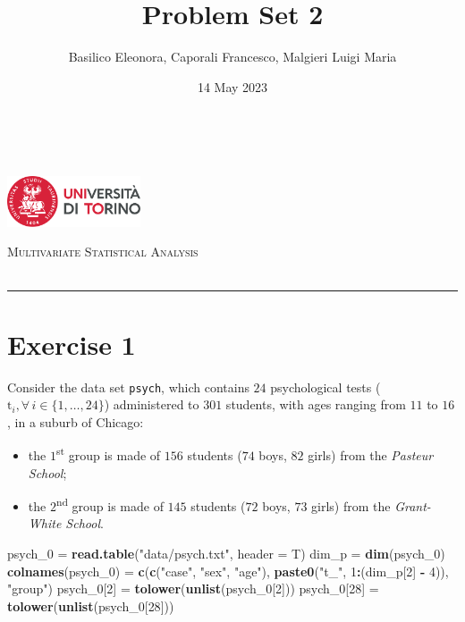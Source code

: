 \documentclass[
]{article}
\title{Problem Set 2}
\author{Basilico Eleonora, Caporali Francesco, Malgieri Luigi Maria}
\date{14 May 2023}
\makeatletter
\newenvironment{Shaded}{\begin{snugshade}}{\end{snugshade}}
\newcommand{\AttributeTok}[1]{\textcolor[rgb]{0.13,0.29,0.53}{#1}}
\newcommand{\DecValTok}[1]{\textcolor[rgb]{0.00,0.00,0.81}{#1}}
\newcommand{\FunctionTok}[1]{\textcolor[rgb]{0.13,0.29,0.53}{\textbf{#1}}}
\newcommand{\NormalTok}[1]{#1}
\newcommand{\OtherTok}[1]{\textcolor[rgb]{0.56,0.35,0.01}{#1}}
\newcommand{\SpecialCharTok}[1]{\textcolor[rgb]{0.81,0.36,0.00}{\textbf{#1}}}
\newcommand{\StringTok}[1]{\textcolor[rgb]{0.31,0.60,0.02}{#1}}
\def\maketitle{%
            \pagestyle{plain}
            \begin{flushleft}
                {\small{%
                    \@author \\
                    \@date
                }}
            \end{flushleft}
            \begin{flushright}\vspace{-15mm}
            \includegraphics[height = 1.5cm]{./files/unito.png}
            \end{flushright}
			\vspace{0.5cm}
            \begin{center}\vspace{-5mm}
                {\Large{\scshape{Multivariate Statistical Analysis}} \\ \vspace{0.1cm}
                \large\scshape \@title} \\
                \vspace{0.25cm}
				\rule{0.75\linewidth}{0.1mm}
            \end{center}
            }
\theoremstyle{plain}
\makeatother
\begin{document}
\maketitle

\hypertarget{exercise-1}{%
\section{Exercise 1}\label{exercise-1}}

Consider the data set \texttt{psych}, which contains \(24\)
psychological tests (\(\text{t}_i, \forall \, i \in \{1, \dots, 24\}\))
administered to \(301\) students, with ages ranging from \(11\) to
\(16\), in a suburb of Chicago:

\begin{itemize}
    \item the $1$\textsuperscript{st} group is made of $156$ students ($74$ boys, $82$ girls) from the \textit{Pasteur School};
    \item the $2$\textsuperscript{nd} group is made of $145$ students ($72$ boys, $73$ girls) from the \textit{Grant-White School}.
\end{itemize}

\smallskip

\begin{Shaded}
\begin{Highlighting}[]
\NormalTok{psych\_0 }\OtherTok{=} \FunctionTok{read.table}\NormalTok{(}\StringTok{"data/psych.txt"}\NormalTok{, }\AttributeTok{header =}\NormalTok{ T)}
\NormalTok{dim\_p }\OtherTok{=} \FunctionTok{dim}\NormalTok{(psych\_0)}
\FunctionTok{colnames}\NormalTok{(psych\_0) }\OtherTok{=} \FunctionTok{c}\NormalTok{(}\FunctionTok{c}\NormalTok{(}\StringTok{"case"}\NormalTok{, }\StringTok{"sex"}\NormalTok{, }\StringTok{"age"}\NormalTok{), }\FunctionTok{paste0}\NormalTok{(}\StringTok{"t\_"}\NormalTok{, }\DecValTok{1}\SpecialCharTok{:}\NormalTok{(dim\_p[}\DecValTok{2}\NormalTok{] }\SpecialCharTok{{-}} \DecValTok{4}\NormalTok{)), }\StringTok{"group"}\NormalTok{)}
\NormalTok{psych\_0[}\DecValTok{2}\NormalTok{] }\OtherTok{=} \FunctionTok{tolower}\NormalTok{(}\FunctionTok{unlist}\NormalTok{(psych\_0[}\DecValTok{2}\NormalTok{]))}
\NormalTok{psych\_0[}\DecValTok{28}\NormalTok{] }\OtherTok{=} \FunctionTok{tolower}\NormalTok{(}\FunctionTok{unlist}\NormalTok{(psych\_0[}\DecValTok{28}\NormalTok{]))}
\end{Highlighting}
\end{Shaded}
\end{document}

